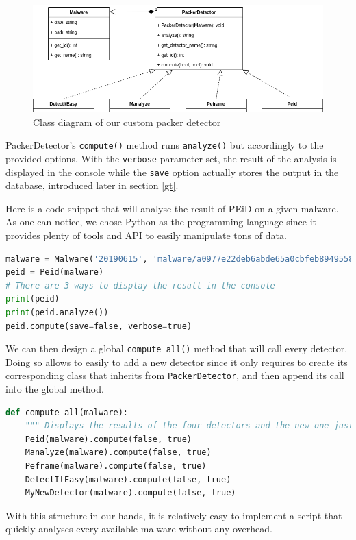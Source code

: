\begin{figure}[hb]
\centering
  \includegraphics[width=\textwidth]{Figures/detector.png}
  \caption{Class diagram of our custom packer detector}
  \label{fig:Detector}
\end{figure}

PackerDetector's \texttt{compute()} method runs \texttt{analyze()} but accordingly to the provided options. With the \texttt{verbose} parameter set, the result of the analysis is displayed in the console while the \texttt{save} option actually stores the output in the database, introduced later in section \ref{gt}.

Here is a code snippet that will analyse the result of PEiD on a given malware. As one can notice, we chose Python as the programming language since it provides plenty of tools and API to easily manipulate tons of data.

\begin{lstlisting}[language=Python]
malware = Malware('20190615', 'malware/a0977e22deb6abde65a0cbfeb8949558')
peid = Peid(malware)
# There are 3 ways to display the result in the console
print(peid)
print(peid.analyze())
peid.compute(save=false, verbose=true)
\end{lstlisting}

We can then design a global \texttt{compute\_all()} method that will call every detector. Doing so allows to easily to add a new detector since it only requires to create its corresponding class that inherits from \texttt{PackerDetector}, and then append its call into the global method.

\begin{lstlisting}[language=Python]
def compute_all(malware):
    """ Displays the results of the four detectors and the new one just added."""
    Peid(malware).compute(false, true)
    Manalyze(malware).compute(false, true)
    Peframe(malware).compute(false, true)
    DetectItEasy(malware).compute(false, true)
    MyNewDetector(malware).compute(false, true)
\end{lstlisting}

With this structure in our hands, it is relatively easy to implement a script that quickly analyses every available malware without any overhead.